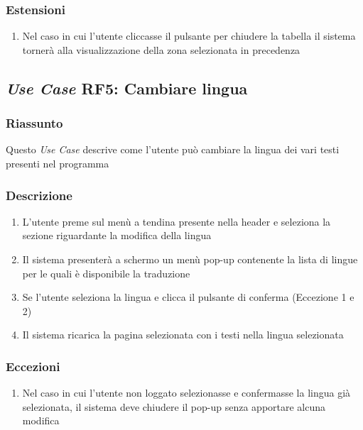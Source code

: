         \subsubsection{Estensioni}
            \begin{enumerate}
                \item Nel caso in cui l'utente cliccasse il pulsante per chiudere la tabella il sistema tornerà alla visualizzazione della zona selezionata in precedenza
            \end{enumerate}

    \subsection{\textit{Use Case} RF5: Cambiare lingua}
        \subsubsection{Riassunto}
            Questo \textit{Use Case} descrive come l'utente può cambiare la lingua dei vari testi presenti nel programma
        \subsubsection{Descrizione}
            \begin{enumerate}
                \item L'utente preme sul menù a tendina presente nella header e seleziona la sezione riguardante la modifica della lingua
                \item Il sistema presenterà a schermo un menù pop-up contenente la lista di lingue per le quali è disponibile la traduzione
                \item Se l'utente seleziona la lingua e clicca il pulsante di conferma (Eccezione 1 e 2)
                \item Il sistema ricarica la pagina selezionata con i testi nella lingua selezionata
            \end{enumerate}
        \subsubsection{Eccezioni}
            \begin{enumerate}
                \item Nel caso in cui l'utente non loggato selezionasse e confermasse la lingua già selezionata, il sistema deve chiudere il pop-up senza apportare alcuna modifica
            \end{enumerate}

